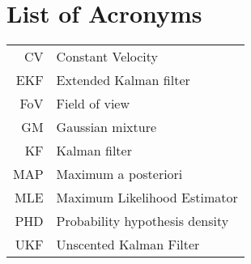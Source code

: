 \chapter{List of Acronyms}

\begin{tabular}{rl}
CV & Constant Velocity \\
EKF & Extended Kalman filter \\
FoV & Field of view \\
GM & Gaussian mixture \\
KF & Kalman filter \\
MAP & Maximum a posteriori \\
MLE & Maximum Likelihood Estimator \\
PHD & Probability hypothesis density \\
UKF & Unscented Kalman Filter \\
\end{tabular}
